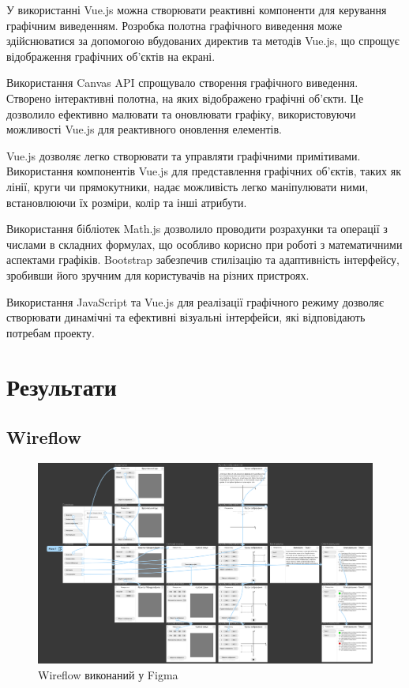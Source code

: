 \documentclass[oneside,14pt]{extarticle}
\begin{document}
\begin{normalsize}
	У використанні Vue.js можна створювати реактивні компоненти для керування графічним виведенням. Розробка полотна графічного виведення може здійснюватися за допомогою вбудованих директив та методів Vue.js, що спрощує відображення графічних об'єктів на екрані.
	
	Використання Canvas API спрощувало створення графічного виведення. Створено інтерактивні полотна, на яких відображено графічні об'єкти. Це дозволило ефективно малювати та оновлювати графіку, використовуючи можливості Vue.js для реактивного оновлення елементів.
	
	Vue.js дозволяє легко створювати та управляти графічними примітивами. Використання компонентів Vue.js для представлення графічних об'єктів, таких як лінії, круги чи прямокутники, надає можливість легко маніпулювати ними, встановлюючи їх розміри, колір та інші атрибути.
	
	Використання бібліотек Math.js дозволило проводити розрахунки та операції з числами в складних формулах, що особливо корисно при роботі з математичними аспектами графіків. Bootstrap забезпечив стилізацію та адаптивність інтерфейсу, зробивши його зручним для користувачів на різних пристроях.
	
	Використання JavaScript та Vue.js для реалізації графічного режиму дозволяє створювати динамічні та ефективні візуальні інтерфейси, які відповідають потребам проекту.
	\section{Результати}
	\subsection{Wireflow}
	\begin{figure}[H]
		\centering
		\includegraphics[scale=0.45]{wireflow}
		\caption{Wireflow виконаний у Figma}
	\end{figure}
	

\end{normalsize}
\end{document}

